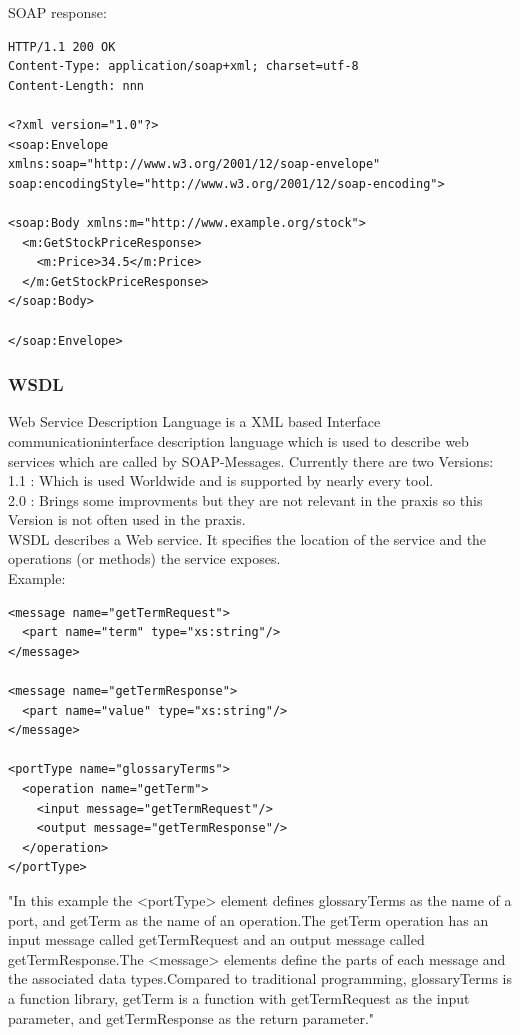 \documentclass[12pt]{article}
\begin{document}
SOAP response:
\begin{lstlisting}
HTTP/1.1 200 OK
Content-Type: application/soap+xml; charset=utf-8
Content-Length: nnn

<?xml version="1.0"?>
<soap:Envelope
xmlns:soap="http://www.w3.org/2001/12/soap-envelope"
soap:encodingStyle="http://www.w3.org/2001/12/soap-encoding">

<soap:Body xmlns:m="http://www.example.org/stock">
  <m:GetStockPriceResponse>
    <m:Price>34.5</m:Price>
  </m:GetStockPriceResponse>
</soap:Body>

</soap:Envelope>
\end{lstlisting}
\cite{soap}

\subsubsection{WSDL}
Web Service Description Language is a XML based Interface communicationinterface description language
which is used to describe web services which are called by SOAP-Messages.
Currently there are two Versions:\\
1.1 : Which is used Worldwide and is supported by nearly every tool. \\
2.0 : Brings some improvments but they are not relevant in the praxis so this Version is not often
used in the praxis.\\
WSDL describes a Web service. It specifies the location of the service and the operations (or methods) the service exposes.\\
Example:
\begin{lstlisting}
<message name="getTermRequest">
  <part name="term" type="xs:string"/>
</message>

<message name="getTermResponse">
  <part name="value" type="xs:string"/>
</message>

<portType name="glossaryTerms">
  <operation name="getTerm">
    <input message="getTermRequest"/>
    <output message="getTermResponse"/>
  </operation>
</portType>
\end{lstlisting}
"In this example the <portType> element defines glossaryTerms as the name of a port, and getTerm as the name of an operation.The getTerm operation has an input message called getTermRequest and an output message called getTermResponse.The <message> elements define the parts of each message and the associated data types.Compared to traditional programming, glossaryTerms is a function library, getTerm is a function with getTermRequest as the input parameter, and getTermResponse as the return parameter."
\cite{wsdl}
\end{document}

